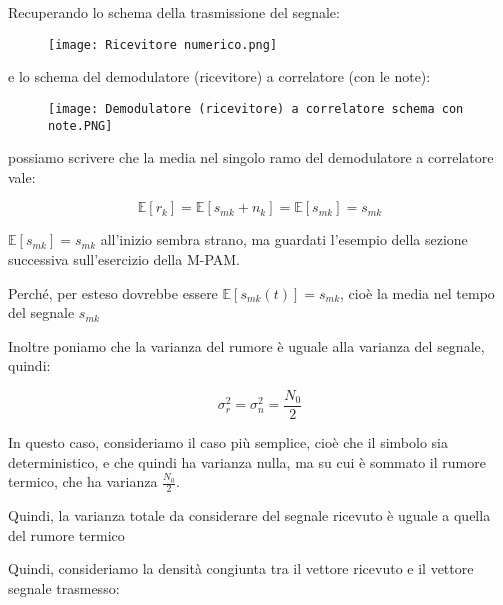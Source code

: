 Recuperando lo schema della trasmissione del segnale: 

\begin{figure}[h]
    \centering
    \texttt{[image: Ricevitore numerico.png]}
\end{figure}

e lo schema del demodulatore (ricevitore) a correlatore (con le note): 

\begin{figure}[h]
    \centering
    \texttt{[image: Demodulatore (ricevitore) a correlatore schema con note.PNG]}
\end{figure} 

possiamo scrivere che la media nel singolo ramo del demodulatore a correlatore vale: 

{
    \Large 
    \begin{equation}
        \mathbb{E} [r_k] = \mathbb{E} [s_{mk} + n_k] = \mathbb{E} [s_{mk}] = s_{mk}
    \end{equation}
}

\begin{tcolorbox}
$\mathbb{E} [s_{mk}] = s_{mk}$ all'inizio sembra strano, ma guardati l'esempio della sezione successiva sull'esercizio della M-PAM. \newline 

Perché, per esteso dovrebbe essere $\mathbb{E} [s_{mk} (t)] = s_{mk}$, 
cioè la media nel tempo del segnale $s_{mk}$
\end{tcolorbox}

Inoltre poniamo che la varianza del rumore è uguale alla varianza del segnale, quindi: 

{
    \Large 
    \begin{equation}
        \sigma_r^{2} = \sigma_n^{2} = \frac{N_0}{2}
    \end{equation}
}

\begin{tcolorbox}
In questo caso, consideriamo il caso più semplice, cioè che il simbolo sia deterministico, e che quindi ha varianza nulla, 
ma su cui è sommato il rumore termico, che ha varianza $\frac{N_0}{2}$. \newline 

Quindi, la varianza totale da considerare del segnale ricevuto è uguale a quella del rumore termico
\end{tcolorbox}

Quindi, consideriamo la densità congiunta tra il vettore ricevuto e il vettore segnale trasmesso: 

